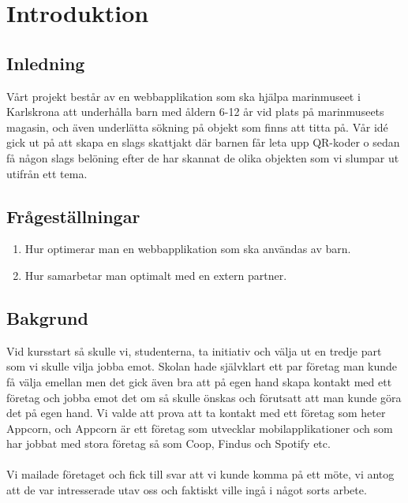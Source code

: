 \documentclass[12pt, titlepage]{article}
\begin{document}


\maketitle

\tableofcontents
\setcounter{page}{0}
\newpage
\section{Introduktion}
\subsection{Inledning}
Vårt projekt består av en webbapplikation som ska hjälpa marinmuseet i Karlskrona att underhålla 
barn med åldern 6-12 år vid plats på marinmuseets magasin, och även underlätta sökning på objekt 
som finns att titta på. Vår idé gick ut på att skapa en slags skattjakt där barnen får 
leta upp QR-koder o sedan få någon slags belöning efter de har skannat de olika objekten som 
vi slumpar ut utifrån ett tema.

\subsection{Frågeställningar}
\begin{enumerate}
  \item Hur optimerar man en webbapplikation som ska användas av barn.
  \item Hur samarbetar man optimalt med en extern partner.
\end{enumerate}

\subsection{Bakgrund}
Vid kursstart så skulle vi, studenterna, ta initiativ och välja ut en tredje part 
som vi skulle vilja jobba emot. Skolan hade självklart ett par företag man kunde 
få välja emellan men det gick även bra att på egen hand skapa kontakt med 
ett företag och jobba emot det om så skulle önskas och förutsatt att man kunde göra 
det på egen hand. Vi valde att prova att ta kontakt med ett företag som heter Appcorn, 
och Appcorn är ett företag som utvecklar mobilapplikationer och som har jobbat med stora 
företag så som Coop, Findus och Spotify etc.
\\
\\
Vi mailade företaget och fick till svar att vi kunde komma på ett möte, 
vi antog att de var intresserade utav oss och faktiskt ville ingå i något sorts arbete. 
\end{document}
